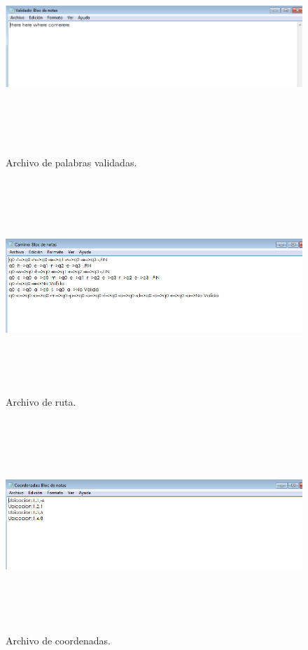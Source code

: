 \documentclass[12pt]{article}
\begin{document}
\begin{figure}[H]
\includegraphics[width=\textwidth, height=8cm]{ereresult}
\caption{Archivo de palabras validadas.}
\label{fig:autómata -ere}
\end{figure}

\begin{figure}[H]
\includegraphics[width=\textwidth, height=8cm]{erecamino}
\caption{Archivo de ruta.}
\label{fig:autómata -ere}
\end{figure}
\begin{figure}[H]
\includegraphics[width=\textwidth, height=8cm]{coordenadas}
\caption{Archivo de coordenadas.}
\label{fig:autómata -ere}
\end{figure}
%
\newpage
\end{document}
